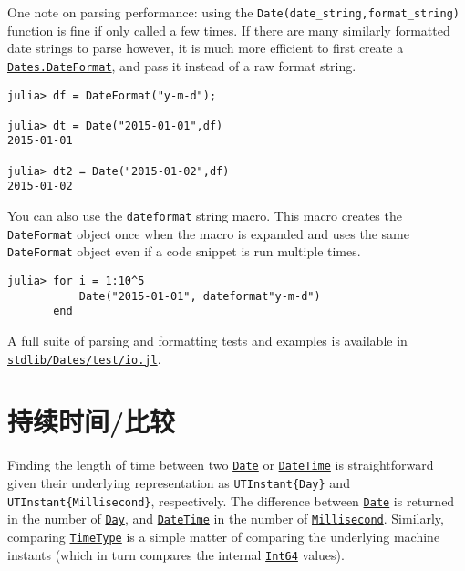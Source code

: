 One note on parsing performance: using the \texttt{Date(date\_string,format\_string)} function is fine if only called a few times. If there are many similarly formatted date strings to parse however, it is much more efficient to first create a \hyperlink{18093459443158853001}{\texttt{Dates.DateFormat}}, and pass it instead of a raw format string.




\begin{verbatim}
julia> df = DateFormat("y-m-d");

julia> dt = Date("2015-01-01",df)
2015-01-01

julia> dt2 = Date("2015-01-02",df)
2015-01-02
\end{verbatim}



You can also use the \texttt{dateformat{\textquotedbl}{\textquotedbl}} string macro. This macro creates the \texttt{DateFormat} object once when the macro is expanded and uses the same \texttt{DateFormat} object even if a code snippet is run multiple times.




\begin{verbatim}
julia> for i = 1:10^5
           Date("2015-01-01", dateformat"y-m-d")
       end
\end{verbatim}



A full suite of parsing and formatting tests and examples is available in \href{https://github.com/JuliaLang/julia/blob/master/stdlib/Dates/test/io.jl}{\texttt{stdlib/Dates/test/io.jl}}.



\hypertarget{5885257312656473374}{}


\section{持续时间/比较}



Finding the length of time between two \hyperlink{4488183467971164548}{\texttt{Date}} or \hyperlink{17572689933274889838}{\texttt{DateTime}} is straightforward given their underlying representation as \texttt{UTInstant\{Day\}} and \texttt{UTInstant\{Millisecond\}}, respectively. The difference between \hyperlink{4488183467971164548}{\texttt{Date}} is returned in the number of \hyperlink{13217464551942182596}{\texttt{Day}}, and \hyperlink{17572689933274889838}{\texttt{DateTime}} in the number of \hyperlink{9366634148855607364}{\texttt{Millisecond}}. Similarly, comparing \hyperlink{4438614350756187528}{\texttt{TimeType}} is a simple matter of comparing the underlying machine instants (which in turn compares the internal \hyperlink{7720564657383125058}{\texttt{Int64}} values).




